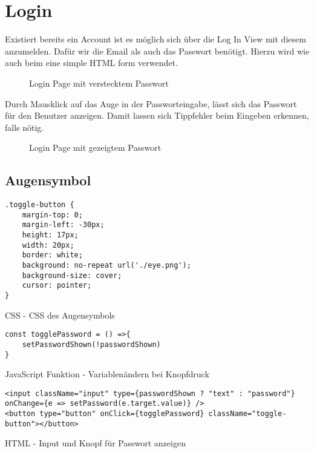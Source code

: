 \newpage
\section{Login}
\label{login}

Existiert bereits ein Account ist es möglich sich über die Log In View mit diesem anzumelden. Dafür 
wir die Email als auch das Passwort benötigt. Hierzu wird wie auch beim \underline{} eine 
simple HTML form verwendet. 

\begin{figure}[H]
    \begin{center}
      \caption{Login Page mit verstecktem Passwort}
    \end{center}
\end{figure}

Durch Mausklick auf das Auge in der Passworteingabe, lässt sich das Passwort für den Benutzer
anzeigen. Damit lassen sich Tippfehler beim Eingeben erkennen, falls nötig. 

\begin{figure}[H]
    \begin{center}
      \caption{Login Page mit gezeigtem Passwort}
    \end{center}
\end{figure}

\subsection{Augensymbol}
\begin{code}[htp]
\begin{lstlisting}
.toggle-button {
    margin-top: 0;
    margin-left: -30px;
    height: 17px;
    width: 20px;
    border: white;
    background: no-repeat url('./eye.png');
    background-size: cover;
    cursor: pointer;
}
\end{lstlisting}
\caption{CSS -  CSS des Augensymbols}
\end{code}
\begin{code}[htp]
\begin{lstlisting}
const togglePassword = () =>{
    setPasswordShown(!passwordShown)
}
\end{lstlisting}
\caption{JavaScript Funktion -  Variablenändern bei Knopfdruck}
\end{code}
\begin{code}[htp]
\begin{lstlisting}
<input className="input" type={passwordShown ? "text" : "password"} onChange={e => setPassword(e.target.value)} />
<button type="button" onClick={togglePassword} className="toggle-button"></button>
\end{lstlisting}
\caption{HTML - Input und Knopf für Passwort anzeigen}
\end{code}

